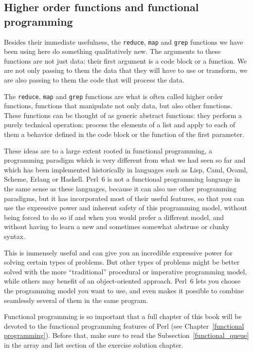 \subsection{Higher order functions and functional programming}
\label{array_functional_programming}

Besides their immediate usefulness, the {\tt reduce}, {\tt map} 
and {\tt grep} functions we have been using here do something 
qualitatively new. The arguments to these functions are not 
just data: their first argument is a code block or a function. 
We are not only passing to them the data that they will have 
to use or transform, we are also passing to them the code 
that will process the data.

The {\tt reduce}, {\tt map} and {\tt grep} functions are 
what is often called higher order functions, functions that 
manipulate not only data, but also other functions. These 
functions can be thought of as generic abstract functions: 
they perform a purely technical operation: process the  
elements of a list and apply to each of them a behavior 
defined in the code block or the function of the first 
parameter.

These ideas are to a large extent rooted in functional 
programming, a programming paradigm which is very different 
from what we had seen so far and which has been implemented 
historically in languages such as Lisp, Caml, Ocaml, Scheme, Erlang or Haskell. Perl~6 is not a functional 
programming language in the same sense as these languages, 
because it can also use other programming paradigms, 
but it has incorporated most of their useful features, so 
that you can use the expressive power and inherent safety 
of this programming model, without being forced to do so 
if and when you would prefer a different model, and
without having to learn a new and sometimes somewhat abstruse or clunky syntax.

This is immensely useful and can give you an incredible 
expressive power for solving certain types of problems. But 
other types of problems might be better solved with the more ``traditional'' procedural or imperative programming model, 
while others may benefit of an object-oriented approach. Perl~6 
lets you choose the programming model you want to use, and even 
makes it possible to combine seamlessly several of them in the 
same program.

Functional programming is so important that a full chapter 
of this book will be devoted to the functional programming 
features of Perl (see Chapter~\ref{functional programming}). 
Before that, make sure to read the Subsection~\ref{functional_queue} 
in the array and list section of the exercise solution chapter.

